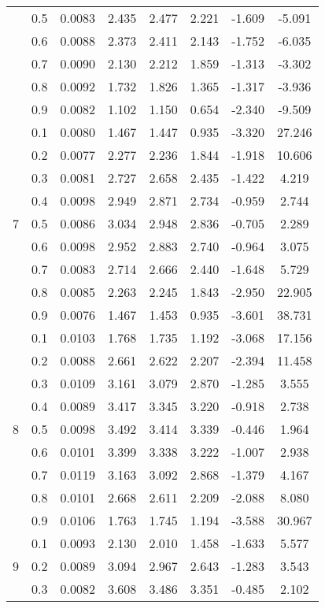 \documentclass[11pt,a4paper]{report}
\begin{document}
\begin{longtable}{ | c | c || c | c | c | c | c | c | }
 & 0.5 & 0.0083 & 2.435 & 2.477 & 2.221 & -1.609 & -5.091 \\
 & 0.6 & 0.0088 & 2.373 & 2.411 & 2.143 & -1.752 & -6.035 \\
 & 0.7 & 0.0090 & 2.130 & 2.212 & 1.859 & -1.313 & -3.302 \\
 & 0.8 & 0.0092 & 1.732 & 1.826 & 1.365 & -1.317 & -3.936 \\
 & 0.9 & 0.0082 & 1.102 & 1.150 & 0.654 & -2.340 & -9.509 \\
 \hline
\multirow{9}{*}{7} & 0.1 & 0.0080 & 1.467 & 1.447 & 0.935 & -3.320 & 27.246 \\
 & 0.2 & 0.0077 & 2.277 & 2.236 & 1.844 & -1.918 & 10.606 \\
 & 0.3 & 0.0081 & 2.727 & 2.658 & 2.435 & -1.422 & 4.219 \\
 & 0.4 & 0.0098 & 2.949 & 2.871 & 2.734 & -0.959 & 2.744 \\
 & 0.5 & 0.0086 & 3.034 & 2.948 & 2.836 & -0.705 & 2.289 \\
 & 0.6 & 0.0098 & 2.952 & 2.883 & 2.740 & -0.964 & 3.075 \\
 & 0.7 & 0.0083 & 2.714 & 2.666 & 2.440 & -1.648 & 5.729 \\
 & 0.8 & 0.0085 & 2.263 & 2.245 & 1.843 & -2.950 & 22.905 \\
 & 0.9 & 0.0076 & 1.467 & 1.453 & 0.935 & -3.601 & 38.731 \\
 \hline
\multirow{9}{*}{8} & 0.1 & 0.0103 & 1.768 & 1.735 & 1.192 & -3.068 & 17.156 \\
 & 0.2 & 0.0088 & 2.661 & 2.622 & 2.207 & -2.394 & 11.458 \\
 & 0.3 & 0.0109 & 3.161 & 3.079 & 2.870 & -1.285 & 3.555 \\
 & 0.4 & 0.0089 & 3.417 & 3.345 & 3.220 & -0.918 & 2.738 \\
 & 0.5 & 0.0098 & 3.492 & 3.414 & 3.339 & -0.446 & 1.964 \\
 & 0.6 & 0.0101 & 3.399 & 3.338 & 3.222 & -1.007 & 2.938 \\
 & 0.7 & 0.0119 & 3.163 & 3.092 & 2.868 & -1.379 & 4.167 \\
 & 0.8 & 0.0101 & 2.668 & 2.611 & 2.209 & -2.088 & 8.080 \\
 & 0.9 & 0.0106 & 1.763 & 1.745 & 1.194 & -3.588 & 30.967 \\
 \hline
\multirow{9}{*}{9} & 0.1 & 0.0093 & 2.130 & 2.010 & 1.458 & -1.633 & 5.577 \\
 & 0.2 & 0.0089 & 3.094 & 2.967 & 2.643 & -1.283 & 3.543 \\
 & 0.3 & 0.0082 & 3.608 & 3.486 & 3.351 & -0.485 & 2.102 \\

\end{longtable}
\end{document}
